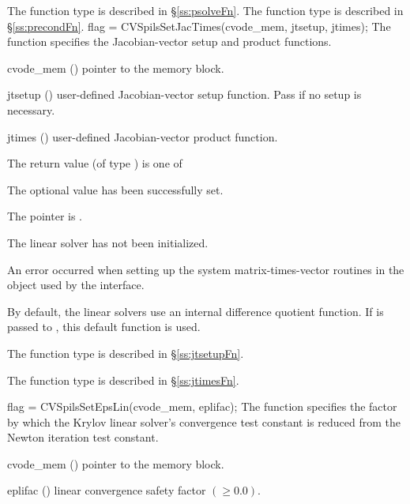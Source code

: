{
   The function type  is described in \S\ref{ss:psolveFn}.
   The function type  is described in \S\ref{ss:precondFn}.
}
{
  flag = CVSpilsSetJacTimes(cvode\_mem, jtsetup, jtimes);
}
{
  The function  specifies the Jacobian-vector 
  setup and product functions.
}
{
  \begin{args}
  \item[cvode\_mem] ()
    pointer to the {\cvode} memory block.
  \item[jtsetup] ()
    user-defined Jacobian-vector setup function.
    Pass  if no setup is necessary.
  \item[jtimes] ()
    user-defined Jacobian-vector product function.
  \end{args}
}
{
  The return value  (of type ) is one of
  \begin{args}
  \item[\Id{CVSPILS\_SUCCESS}] 
    The optional value has been successfully set.
  \item[\Id{CVSPILS\_MEM\_NULL}]
    The  pointer is .
  \item[\Id{CVSPILS\_LMEM\_NULL}]
    The {\cvspils} linear solver has not been initialized.
  \item[\Id{CVSPILS\_SUNLS\_FAIL}]
    An error occurred when setting up the system matrix-times-vector
    routines in the {\sunlinsol} object used by the {\cvspils}
    interface.
  \end{args}
}
{
  By default, the {\cvspils} linear solvers use an internal difference
  quotient function.  If  is passed to , this
  default function is used. 

  The function type  is described in \S\ref{ss:jtsetupFn}.

  The function type  is described in \S\ref{ss:jtimesFn}.
}
{
  flag = CVSpilsSetEpsLin(cvode\_mem, eplifac);
}
{
  The function  specifies the factor by
  which the Krylov linear solver's convergence test constant is
  reduced from the Newton iteration test constant.
}
{
  \begin{args}
  \item[cvode\_mem] ()
    pointer to the {\cvode} memory block.
  \item[eplifac] () linear convergence safety factor $(
    \geq 0.0)$. 

  \end{args}
}
